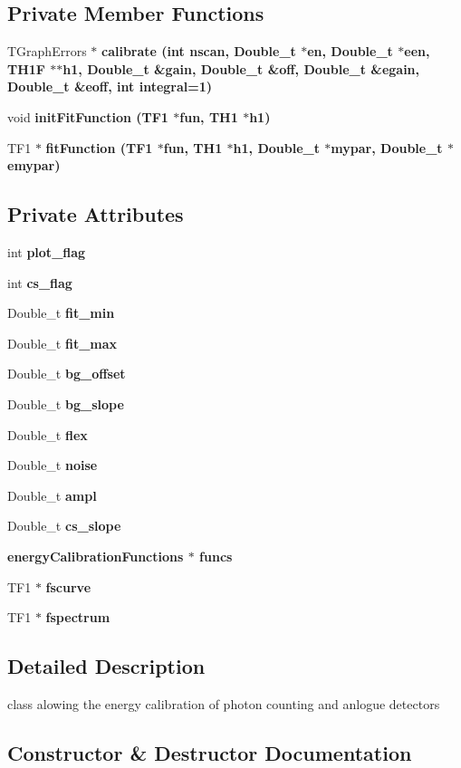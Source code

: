 \subsection*{Private Member Functions}
\begin{CompactItemize}
\item 
TGraph\-Errors $\ast$ \bf{calibrate} (int nscan, Double\_\-t $\ast$en, Double\_\-t $\ast$een, TH1F $\ast$$\ast$h1, Double\_\-t \&gain, Double\_\-t \&off, Double\_\-t \&egain, Double\_\-t \&eoff, int integral=1)
\item 
void \bf{init\-Fit\-Function} (TF1 $\ast$fun, TH1 $\ast$h1)
\item 
TF1 $\ast$ \bf{fit\-Function} (TF1 $\ast$fun, TH1 $\ast$h1, Double\_\-t $\ast$mypar, Double\_\-t $\ast$emypar)
\end{CompactItemize}
\subsection*{Private Attributes}
\begin{CompactItemize}
\item 
int \bf{plot\_\-flag}
\item 
int \bf{cs\_\-flag}
\item 
Double\_\-t \bf{fit\_\-min}
\item 
Double\_\-t \bf{fit\_\-max}
\item 
Double\_\-t \bf{bg\_\-offset}
\item 
Double\_\-t \bf{bg\_\-slope}
\item 
Double\_\-t \bf{flex}
\item 
Double\_\-t \bf{noise}
\item 
Double\_\-t \bf{ampl}
\item 
Double\_\-t \bf{cs\_\-slope}
\item 
\bf{energy\-Calibration\-Functions} $\ast$ \bf{funcs}
\item 
TF1 $\ast$ \bf{fscurve}
\item 
TF1 $\ast$ \bf{fspectrum}
\end{CompactItemize}


\subsection{Detailed Description}
class alowing the energy calibration of photon counting and anlogue detectors 



\subsection{Constructor \& Destructor Documentation}
